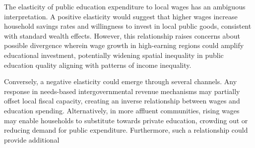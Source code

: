 \documentclass[
  10pt,
]{article}
\begin{document}
The elasticity of public education expenditure to local wages has an
ambiguous interpretation. A positive elasticity would suggest that
higher wages increase household savings rates and willingness to invest
in local public goods, consistent with standard wealth effects. However,
this relationship raises concerns about possible divergence wherein wage
growth in high-earning regions could amplify educational investment,
potentially widening spatial inequality in public education quality
aligning with patterns of income inequality.

Conversely, a negative elasticity could emerge through several channels.
Any response in needs-based intergovernmental revenue mechanisms may
partially offset local fiscal capacity, creating an inverse relationship
between wages and education spending. Alternatively, in more affluent
communities, rising wages may enable households to substitute towards
private education, crowding out or reducing demand for public
expenditure. Furthermore, such a relationship could provide additional
\end{document}
